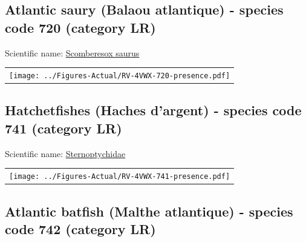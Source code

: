 \documentclass[12pt]{article}\usepackage[]{graphicx}\usepackage[]{color}
\begin{document}
\hypertarget{sec:720}{%
\subsection{Atlantic saury (Balaou atlantique) - species code 720 (category LR)}\label{sec:720}}

  


Scientific name: \href{http://www.marinespecies.org/aphia.php?p=taxdetails\&id=126392}{Scomberesox saurus} \newline
\begin{minipage}{1.0\textwidth}
 \begin{tabular}{c}
\texttt{[image: ../Figures-Actual/RV-4VWX-720-presence.pdf]} \\ 
\end{tabular} 
\end{minipage}
\clearpage

\renewcommand\thefigure{\thesubsection\Alph{figure}}

\setcounter{figure}{0}

\hypertarget{sec:741}{%
\subsection{Hatchetfishes (Haches d'argent) - species code 741 (category LR)}\label{sec:741}}

  


Scientific name: \href{http://www.marinespecies.org/aphia.php?p=taxdetails\&id=125603}{Sternoptychidae} \newline
\begin{minipage}{1.0\textwidth}
 \begin{tabular}{c}
\texttt{[image: ../Figures-Actual/RV-4VWX-741-presence.pdf]} \\ 
\end{tabular} 
\end{minipage}
\clearpage

\renewcommand\thefigure{\thesubsection\Alph{figure}}

\setcounter{figure}{0}

\hypertarget{sec:742}{%
\subsection{Atlantic batfish (Malthe atlantique) - species code 742 (category LR)}\label{sec:742}}
\end{document}
